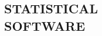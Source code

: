\documentclass[margin, 10pt]{res} %
\begin{document}
\begin{resume}

%
%


\vspace{.2cm}



\section{\sf STATISTICAL\\ SOFTWARE} 


\end{resume}
\end{document}
